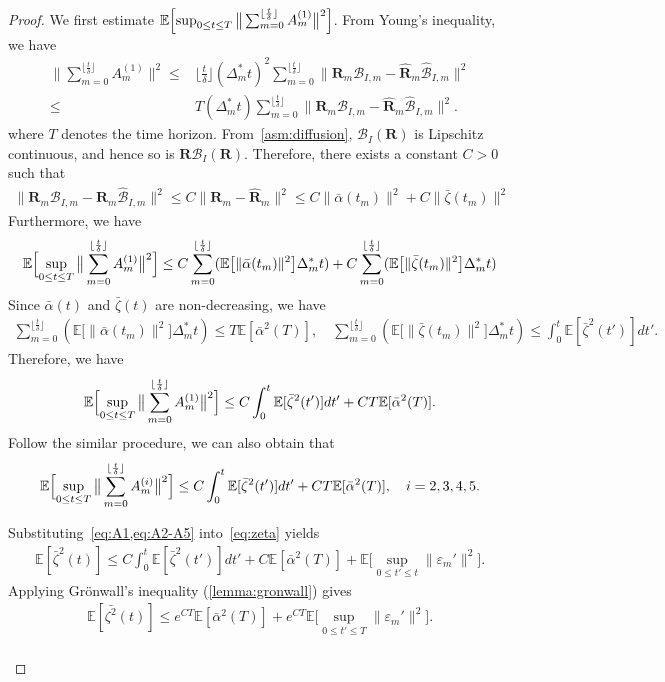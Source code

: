 \documentclass[11pt, a4paper, onecolumn]{article}
\newcommand{\E}{\mathbb{E}}
\newcommand{\m}{m}
\newcommand{\bfR}{\mathbf{R}}
\newcommand{\B}{\mathcal{B}}
\newcommand{\hatB}{\widehat{\B}}
\newcommand{\hatR}{\widehat{\bfR}}
\newcommand{\BIms}{{\B_{I,\m}}}
\newcommand{\hBIms}{{\hatB_{I,\m}}}
\newcommand{\Dms}{{\Delta^{*}_{m}}}
\newcommand{\sumub}{{\lfloor \frac{t}{\delta} \rfloor}}
\newcommand{\hRms}{{\hatR_\m}}
\newcommand{\Rms}{{\bfR_\m}}
\newcommand{\eprm}{\varepsilon_m'}
\newcommand{\suptpt}{\sup_{0 \le t'\le t}}
\newcommand{\EsupN}[1]{\E\Bigl[ \sup_{0 \le t\le T} \big\| \sum_{m=0}^{\sumub} #1 \big\|^2 \Bigr]}
\begin{document}
\begin{appendices}
\begin{proof}
We first estimate $\EsupN{A^{(1)}_m}$. From Young's inequality, we have
\begin{align*}
    \big\|\sum_{m=0}^{\sumub} A^{(1)}_m\big\|^2 \le & \sumub  (\Dms t)^2 \sum_{m=0}^{\sumub} \|\Rms \BIms - \hRms \hBIms\|^2 \\ 
    \le & T (\Dms t)\sum_{m=0}^{\sumub} \|\Rms \BIms - \hRms \hBIms\|^2.
\end{align*}
where $T$ denotes the time horizon.  
From~\cref{asm:diffusion}, $\B_I(\bfR)$ is Lipschitz continuous, and hence so is $\bfR\B_I(\bfR)$.  
Therefore, there exists a constant $C>0$ such that
\begin{align*}
     \|\Rms \BIms - \hRms \hBIms\|^2 \le C\| \bfR_m - \hatR_m\|^2 \le C \|\bar\alpha(t_m)\|^2  + C\|\bar\zeta(t_m)\|^2
\end{align*}
Furthermore, we have
\begin{align*}
     \EsupN{ A^{(1)}_m} \le  C \sum_{m=0}^{\sumub}(\E\big[\|\bar\alpha(t_m)\|^2\big]\Dms t)  + C\sum_{m=0}^{\sumub}(\E\big[\|\bar\zeta(t_m)\|^2\big]\Dms t)
\end{align*}
Since $\bar\alpha(t)$ and $\bar\zeta(t)$ are non-decreasing, we have
\begin{align*}
     \sum_{m=0}^{\sumub}(\E\big[\|\bar\alpha(t_m)\|^2\big]\Dms t) \le T \E[\bar \alpha^2(T)],\quad \sum_{m=0}^{\sumub}(\E\big[\|\bar\zeta(t_m)\|^2\big]\Dms t) \le  \int_{0}^t \E[\bar \zeta^2(t')] dt'.
\end{align*}
Therefore, we have
\begin{align}\label{eq:A1}
      \EsupN{ A^{(1)}_m} \le C \int_{0}^t \E[\bar \zeta^2(t')] dt' + C T \E[\bar \alpha^2(T)].
\end{align}
Follow the similar procedure, we can also obtain that
\begin{align}\label{eq:A2-A5}
    \EsupN{ A^{(i)}_m}\le C \int_{0}^t \E[\bar \zeta^2(t')] dt' + C T \E[\bar \alpha^2(T)],\quad  i=2,3,4,5.
\end{align}

Substituting~\cref{eq:A1,eq:A2-A5} into~\cref{eq:zeta} yields
\begin{align*}
    \E[\bar{\zeta}^2(t)] \le  C \int_{0}^t \E[\bar \zeta^2(t')] dt' + C\E[\bar \alpha^2(T)] + \E\big[ \suptpt \|\eprm\|^2 \big].
\end{align*}
Applying Gr\"onwall’s inequality (\ref{lemma:gronwall}) gives
\begin{align}\label{eq:app-C-combine-1}
    \E[\bar{\zeta^2}(t)] \le  e^{CT} \E[\bar \alpha^2(T)] + e^{CT}\E\big[  \sup_{0\le t'\le T}  \|\eprm\|^2 \big].
\end{align}
\\


\end{proof}
\end{appendices}
\end{document}
